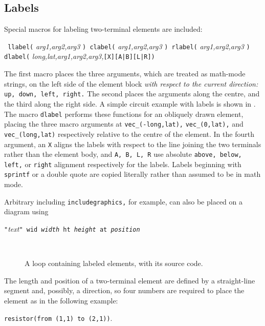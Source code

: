 \subsection{Labels\label{Labels:}}
   Special macros for labeling two-terminal elements are included:
\par
{\tt
   llabel(} {\sl arg1,arg2,arg3} {\tt )
      \hfill\break\hspace*{\parindent}%
   clabel(} {\sl arg1,arg2,arg3} {\tt )
      \hfill\break\hspace*{\parindent}%
   rlabel(} {\sl arg1,arg2,arg3} {\tt )
      \hfill\break\hspace*{\parindent}%
   dlabel(} {\sl long,lat,arg1,arg2,arg3,}{\tt[X][A|B][L|R])}

The first macro places the three arguments, which are treated as math-mode
strings, on the left side of the element block {\em with respect to the
current direction:} {\tt up, down, left, right.}
The second places the arguments along the centre, and the third along the
right side.
A simple circuit example with labels is shown in .
The macro {\tt dlabel} performs these functions for an
obliquely drawn element, placing the three macro arguments at
{\tt vec\_(-long,lat),} {\tt vec\_(0,lat),} and {\tt vec\_(long,lat)}
respectively relative to the centre of the element.
In the fourth argument, an {\tt X} aligns the labels with respect to the line
joining the two terminals rather than the element body, and
{\tt A, B, L, R} use absolute {\tt above, below, left,} or {\tt right} alignment
respectively for the labels.
Labels beginning
with {\tt sprintf} or a double quote are copied literally rather than
assumed to be in math mode.

   Arbitrary \latex including {\bsl\tt includegraphics,} for example,
   can also be placed on a diagram using

   {\tt "}{\sl \latex text}{\tt" wid {\sl width} ht {\sl height}
      at {\sl position}}

\begin{figure}[ht]
   \vspace*{-\baselineskip}
   \parbox{4in}{\small }%
   \hfill\raise-0.5in\hbox{ }
   \vspace*{-\baselineskip}
   \caption{A loop containing labeled elements, with its source code.}
   \label{Loop}
   \end{figure}

The length and position of a two-terminal element
are defined by a straight-line segment and, possibly, a direction, so
four numbers are required to place the element as in the following example:
\par
{\tt resistor(from (1,1) to (2,1))}.


